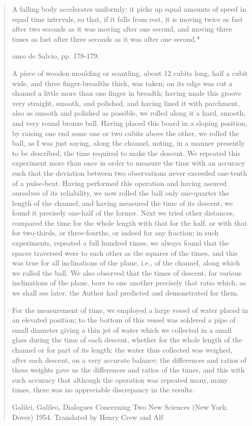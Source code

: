 \begin{quotation}
A falling body accelerates uniformly:
it picks up equal amounts of speed in
equal time intervals, so that, if it
falls from rest, it is moving twice
as fast after two seconds as it was
moving after one second, and moving
three times as fast after three seconds
as it was after one second.*

onso de Salvio, pp. 178-179:

\medskip
 A piece of wooden moulding or
scantling, about 12 cubits long, half
a cubit wide, and three finger-breadths
thick, was taken; on its edge was cut
a channel a little more than one finger
in breadth; having made this groove
very straight, smooth, and polished,
and having lined it with parchment,
also as smooth and polished as possible,
we rolled along it a hard, smooth, and
very round bronze ball. Having placed
this board in a sloping position, by
raising one end some one or two cubits
above the other, we rolled the ball, as
I was just saying, along the channel,
noting, in a manner presently to be
described, the time required to make
the descent. We repeated this experiment
more than once in order to measure the
time with an accuracy such that the
deviation between two observations never
exceeded one-tenth of a pulse-beat.
Having performed this operation
and having assured ourselves of its
reliability, we now rolled the ball
only one-quarter the length of the
channel; and having measured the time
of its descent, we found it precisely
one-half of the former. Next we tried
other distances, compared the time for
the whole length with that for the
half, or with that for two-thirds,
or three-fourths, or indeed for any
fraction; in such experiments, repeated
a full hundred times, we always found
that the spaces traversed were to each
other as the squares of the times, and
this was true for all inclinations of
the plane, i.e., of the channel, along
which we rolled the ball. We also
observed that the times of descent,
for various inclinations of the plane,
bore to one another precisely that
ratio which, as we shall see later, the
Author had predicted and demonstrated
for them.

\medskip
For the measurement of time, we
employed a large vessel of water placed
in an elevated position; to the bottom
of this vessel was soldered a pipe of
small diameter giving a thin jet of
water which we collected in a small
glass during the time of each descent,
whether for the whole length of the
channel or for part of its length;
the water thus collected was weighed,
after each descent, on a very accurate
balance; the differences and ratios of
these weights gave us the differences
and ratios of the times, and this
with such accuracy that although the
operation was repeated many, many times,
there was no appreciable discrepancy
in the results.

\medskip

Galilei, Galileo, Dialogues Concerning
Two New Sciences (New York: Dover)
1954. Translated by Henry Crew and
Alf
\end{quotation}

